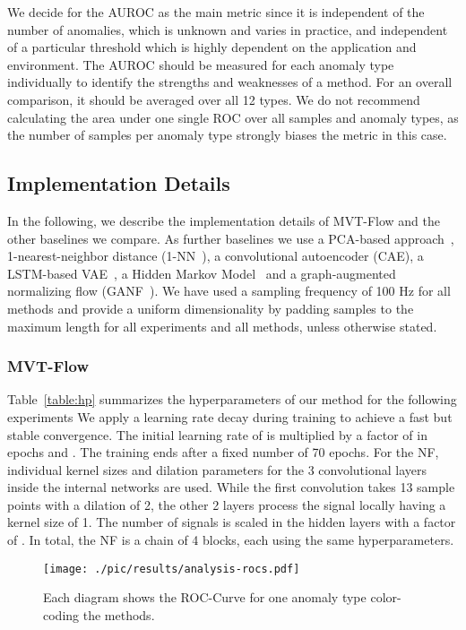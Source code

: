\documentclass[journal]{IEEEtran}
\begin{document}
We decide for the AUROC as the main metric since it is independent of the number of anomalies, which is unknown and varies in practice, and independent of a particular threshold which is highly dependent on the application and environment.
The AUROC should be measured for each anomaly type individually to identify the strengths and weaknesses of a method.
For an overall comparison, it should be averaged over all 12 types.
We do not recommend calculating the area under one single ROC over all samples and anomaly types, as the number of samples per anomaly type strongly biases the metric in this case.


\subsection{Implementation Details}
\label{imp_details}


{In the following, we describe the implementation details of MVT-Flow and the other baselines we compare. As further baselines we use a PCA-based approach~\cite{hornung2014model}, 1-nearest-neighbor distance (1-NN~\cite{amer2012nearest}), a convolutional autoencoder (CAE), a LSTM-based VAE~\cite{park2018multimodal}, a Hidden Markov Model~\cite{hmm_ad} and a graph-augmented normalizing flow (GANF~\cite{GANF}).
We have used a sampling frequency of 100 Hz for all methods and provide a uniform dimensionality by padding samples to the maximum length for all experiments and all methods, unless otherwise stated.}
\subsubsection{MVT-Flow}
Table~\ref{table:hp} summarizes the hyperparameters of our method for the following experiments
We apply a learning rate decay during training to achieve a fast but stable convergence. The initial learning rate of  is multiplied by a factor of  in epochs  and .
The training ends after a fixed number of 70 epochs.
For the NF, individual kernel sizes and dilation parameters for the 3 convolutional layers inside the internal networks are used.
While the first convolution takes 13 sample points with a dilation of 2, the other 2 layers process the signal locally having a kernel size of 1.
The number of signals is scaled in the hidden layers with a factor of .
In total, the NF is a chain of 4 blocks, each using the same hyperparameters.

\begin{figure*}

    \centering
    \texttt{[image: ./pic/results/analysis-rocs.pdf]}
    \caption{Each diagram shows the ROC-Curve for one anomaly type color-coding the methods.
    }
    \label{fig:analysis_rocs}
    \vspace{-3mm}
    
\end{figure*}
\end{document}
